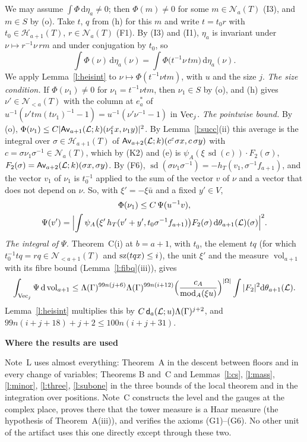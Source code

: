 \documentclass[11pt,a4paper]{article}
\makeatletter
\newcommand{\m}[1]{\mbox{$#1$}}        %
\newcommand{\sect}[2]{\refstepcounter{section}\label{#2}\par\addvspace{19pt plus 4pt minus 2pt}\Needspace{7\baselineskip}%
  \noindent\llap{{\fontsize{13.2}{16}\selectfont\bfseries\color{inkfaint}\thesection}\hspace{9pt}}%
  {\fontsize{13.2}{16}\selectfont\bfseries\color{ink}#1}\par\nopagebreak\vspace{-1pt}}
\theoremstyle{plainx}
\theoremstyle{uprightx}
\renewenvironment{proof}[1][Proof]{\par\pushQED{\qed}\normalfont\topsep0pt\partopsep0pt
  \trivlist\item[\hskip\labelsep\itshape #1.]\ignorespaces}{\popQED\endtrivlist\@endpefalse}
\newcommand{\cL}{\mathcal{L}}
\newcommand{\dd}{\mathrm{d}}
\newcommand{\Hl}[2]{\mathcal{H}_{#1}(#2)}
\newcommand{\Nb}[2]{\mathcal{N}_{<#1}(#2)}
\newcommand{\Nf}[2]{\mathcal{N}_{#1}(#2)}
\newcommand{\modA}{\operatorname{mod}_A}
\newcommand{\sd}{\operatorname{sd}}
\newcommand{\vol}{\operatorname{vol}}
\newcommand{\Inp}[1]{\textup{(#1)}}
\makeatother
\begin{document}
\begin{proof}[Proof of Theorem C\textup{(ii)}]
We may assume $\int\Phi\,\dd\eta_a\ne0$; then $\Phi(m)\ne0$ for some $m\in\Nf{a}{T}$ \Inp{I3}, and $m\in S$ by
(o). Take $t$, $q$ from (h) for this $m$ and write $t=t_0r$ with $t_0\in\Hl{a+1}{T}$, $r\in\Nf{a}{T}$ (F1). By
\Inp{I3} and \Inp{I1}, $\eta_a$ is invariant under $\nu\mapsto r^{-1}\nu\,rm$ and under conjugation by $t_0$, so
\[\int\Phi(\nu)\,\dd\eta_a(\nu)=\int\Phi\bigl(t^{-1}\nu\,tm\bigr)\,\dd\eta_a(\nu).\]
We apply Lemma~\ref{l:heisint} to $\nu\mapsto\Phi(t^{-1}\nu tm)$, with $u$ and the size $j$. \emph{The size
condition.} If $\Phi(\nu_1)\ne0$ for $\nu_1=t^{-1}\nu tm$, then $\nu_1\in S$ by (o), and (h) gives
$\nu'\in\Nb{a}{T}$ with the column at $e^*_a$ of $u^{-1}(\nu'tm(t\nu_1)^{-1}-1)=u^{-1}(\nu'\nu^{-1}-1)$ in
$\mathrm{Vec}_{j}$. \emph{The pointwise bound.} By (o), $\Phi(\nu_1)\le C|\upperPairing{\cL}{a+1}{k}{\nu_1^{\varepsilon}x}{\nu_1y}|^2$.
By Lemma~\ref{l:succ}(ii) this average is the integral over $\sigma\in\Hl{a+1}{T}$ of
$\upperPairing{\cL}{a+2}{k}{c^{\varepsilon}\sigma x}{c\,\sigma y}$ with $c=\sigma\nu_1\sigma^{-1}\in\Nf{a}{T}$,
which by (K2) and (e) is $\psi_A(\xi\,\sd(c))\cdot F_2(\sigma)$, $F_2(\sigma)=\upperPairing{\cL}{a+2}{k}{\sigma x}{\sigma y}$.
By (F6), $\sd(\sigma\nu_1\sigma^{-1})=-h_T(v_1,\sigma^{-1}f_{a+1})$, and the vector $v_1$ of $\nu_1$ is
$t_0^{-1}$ applied to the sum of the vector $v$ of $\nu$ and a vector that does not depend on $\nu$. So, with
$\xi'=-\xi\bar u$ and a fixed $y'\in V$,
\[\begin{gathered}\Phi(\nu_1)\le C\,\Psi(u^{-1}v),\\
\Psi(v')=\Bigl|\int\psi_A\bigl(\xi'\,h_T(v'+y',t_0\sigma^{-1}f_{a+1})\bigr)F_2(\sigma)\,\dd\floorMeasure{\cL}{a+1}(\sigma)\Bigr|^{2}.\end{gathered}\]
\emph{The integral of $\Psi$.} Theorem~C(i) at $b=a+1$, with $t_0$, the element $tq$ (for which
$t_0^{-1}tq=rq\in\Nb{a+1}{T}$ and \m{\HasMatSize{i}{tqx}}), the unit $\xi'$ and the measure $\vol_{a+1}$ with its
fibre bound (Lemma~\ref{l:fibq}(iii)), gives
\[\int_{\vecsOfSize{j}}\Psi\,\dd\vol_{a+1}\le\Lambda(\Gamma)^{99n(j+6)}\Lambda(\Gamma)^{99n(i+12)}\Bigl(\frac{c_A}{\modA(\xi u)}\Bigr)^{|\Omega|}\int|F_2|^2\dd\floorMeasure{\cL}{a+1}.\]
Lemma~\ref{l:heisint} multiplies this by $C\,\floorModulus{\cL}{a}{u}\Lambda(\Gamma)^{j+2}$, and
$99n(i+j+18)+j+2\le100n(i+j+31)$.
\end{proof}

\sect{Where the results are used}{s:used}
Note~L uses almost everything: Theorem~A in the descent between floors and in every change of variables; Theorems B
and~C and Lemmas~\ref{l:cs}, \ref{l:mass}, \ref{l:minor}, \ref{l:three}, \ref{l:subone} in the three bounds of the
local theorem and in the integration over positions. Note~C constructs the level and the gauges at the complex
place, proves there that the tower measure is a Haar measure (the hypothesis of Theorem~A(iii)), and verifies the
axioms (G1)--(G6). No other unit of the artifact uses this one directly except through these two.
\end{document}
